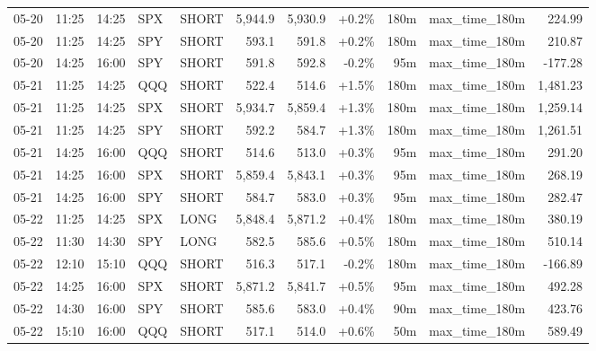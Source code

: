 \documentclass[11pt,a4paper,twoside]{article}
\begin{document}
\begin{center}
\begin{longtable}{>{\color{txtmain}}l l l l l r r r r >{\color{txtmain}}l r}
05-20 & 11:25 & 14:25 & SPX & SHORT & 5,944.9 & 5,930.9 & \textcolor{wingreen}{+0.2\%} & 180m & max\_time\_180m & \textcolor{wingreen}{224.99} \\
05-20 & 11:25 & 14:25 & SPY & SHORT & 593.1 & 591.8 & \textcolor{wingreen}{+0.2\%} & 180m & max\_time\_180m & \textcolor{wingreen}{210.87} \\
05-20 & 14:25 & 16:00 & SPY & SHORT & 591.8 & 592.8 & \textcolor{lossred}{-0.2\%} & 95m & max\_time\_180m & \textcolor{lossred}{-177.28} \\
05-21 & 11:25 & 14:25 & QQQ & SHORT & 522.4 & 514.6 & \textcolor{wingreen}{+1.5\%} & 180m & max\_time\_180m & \textcolor{wingreen}{1,481.23} \\
05-21 & 11:25 & 14:25 & SPX & SHORT & 5,934.7 & 5,859.4 & \textcolor{wingreen}{+1.3\%} & 180m & max\_time\_180m & \textcolor{wingreen}{1,259.14} \\
05-21 & 11:25 & 14:25 & SPY & SHORT & 592.2 & 584.7 & \textcolor{wingreen}{+1.3\%} & 180m & max\_time\_180m & \textcolor{wingreen}{1,261.51} \\
05-21 & 14:25 & 16:00 & QQQ & SHORT & 514.6 & 513.0 & \textcolor{wingreen}{+0.3\%} & 95m & max\_time\_180m & \textcolor{wingreen}{291.20} \\
05-21 & 14:25 & 16:00 & SPX & SHORT & 5,859.4 & 5,843.1 & \textcolor{wingreen}{+0.3\%} & 95m & max\_time\_180m & \textcolor{wingreen}{268.19} \\
05-21 & 14:25 & 16:00 & SPY & SHORT & 584.7 & 583.0 & \textcolor{wingreen}{+0.3\%} & 95m & max\_time\_180m & \textcolor{wingreen}{282.47} \\
05-22 & 11:25 & 14:25 & SPX & LONG & 5,848.4 & 5,871.2 & \textcolor{wingreen}{+0.4\%} & 180m & max\_time\_180m & \textcolor{wingreen}{380.19} \\
05-22 & 11:30 & 14:30 & SPY & LONG & 582.5 & 585.6 & \textcolor{wingreen}{+0.5\%} & 180m & max\_time\_180m & \textcolor{wingreen}{510.14} \\
05-22 & 12:10 & 15:10 & QQQ & SHORT & 516.3 & 517.1 & \textcolor{lossred}{-0.2\%} & 180m & max\_time\_180m & \textcolor{lossred}{-166.89} \\
05-22 & 14:25 & 16:00 & SPX & SHORT & 5,871.2 & 5,841.7 & \textcolor{wingreen}{+0.5\%} & 95m & max\_time\_180m & \textcolor{wingreen}{492.28} \\
05-22 & 14:30 & 16:00 & SPY & SHORT & 585.6 & 583.0 & \textcolor{wingreen}{+0.4\%} & 90m & max\_time\_180m & \textcolor{wingreen}{423.76} \\
05-22 & 15:10 & 16:00 & QQQ & SHORT & 517.1 & 514.0 & \textcolor{wingreen}{+0.6\%} & 50m & max\_time\_180m & \textcolor{wingreen}{589.49} \\

\end{longtable}
\end{center}
\end{document}
